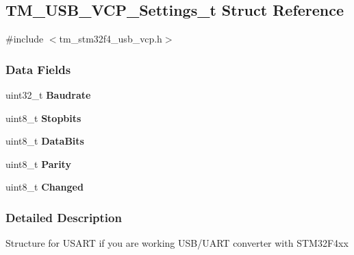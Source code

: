 \hypertarget{struct_t_m___u_s_b___v_c_p___settings__t}{}\subsection{T\+M\+\_\+\+U\+S\+B\+\_\+\+V\+C\+P\+\_\+\+Settings\+\_\+t Struct Reference}
\label{struct_t_m___u_s_b___v_c_p___settings__t}


{\ttfamily \#include $<$tm\+\_\+stm32f4\+\_\+usb\+\_\+vcp.\+h$>$}

\subsubsection*{Data Fields}
\begin{DoxyCompactItemize}
\item 
\hypertarget{struct_t_m___u_s_b___v_c_p___settings__t_a4b42a9c4d0df587a25246854bb990bc8}{}uint32\+\_\+t {\bfseries Baudrate}\label{struct_t_m___u_s_b___v_c_p___settings__t_a4b42a9c4d0df587a25246854bb990bc8}

\item 
\hypertarget{struct_t_m___u_s_b___v_c_p___settings__t_a5cc284a76ce5888fbd57ff1dc73f0a58}{}uint8\+\_\+t {\bfseries Stopbits}\label{struct_t_m___u_s_b___v_c_p___settings__t_a5cc284a76ce5888fbd57ff1dc73f0a58}

\item 
\hypertarget{struct_t_m___u_s_b___v_c_p___settings__t_aa6b79ada9acb03c5272a9a2cca188e94}{}uint8\+\_\+t {\bfseries Data\+Bits}\label{struct_t_m___u_s_b___v_c_p___settings__t_aa6b79ada9acb03c5272a9a2cca188e94}

\item 
\hypertarget{struct_t_m___u_s_b___v_c_p___settings__t_a9423654bdf9e9df7c82c71a571b24f13}{}uint8\+\_\+t {\bfseries Parity}\label{struct_t_m___u_s_b___v_c_p___settings__t_a9423654bdf9e9df7c82c71a571b24f13}

\item 
\hypertarget{struct_t_m___u_s_b___v_c_p___settings__t_a2eac8b0986a23ca6c08c077476ed4775}{}uint8\+\_\+t {\bfseries Changed}\label{struct_t_m___u_s_b___v_c_p___settings__t_a2eac8b0986a23ca6c08c077476ed4775}

\end{DoxyCompactItemize}


\subsubsection{Detailed Description}
Structure for U\+S\+A\+R\+T if you are working U\+S\+B/\+U\+A\+R\+T converter with S\+T\+M32\+F4xx

